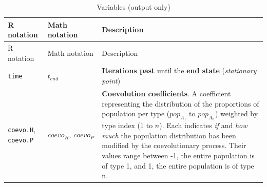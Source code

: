 \documentclass[]{book}
\begin{document}
\begin{longtable}[]{@{}lll@{}}
\caption{Variables (output only)}\tabularnewline
\toprule
\begin{minipage}[b]{0.36\columnwidth}\raggedright
R notation\strut
\end{minipage} & \begin{minipage}[b]{0.21\columnwidth}\raggedright
Math notation\strut
\end{minipage} & \begin{minipage}[b]{0.34\columnwidth}\raggedright
Description\strut
\end{minipage}\tabularnewline
\midrule
\endfirsthead
\toprule
\begin{minipage}[b]{0.36\columnwidth}\raggedright
R notation\strut
\end{minipage} & \begin{minipage}[b]{0.21\columnwidth}\raggedright
Math notation\strut
\end{minipage} & \begin{minipage}[b]{0.34\columnwidth}\raggedright
Description\strut
\end{minipage}\tabularnewline
\midrule
\endhead
\begin{minipage}[t]{0.36\columnwidth}\raggedright
\texttt{time}\strut
\end{minipage} & \begin{minipage}[t]{0.21\columnwidth}\raggedright
\(t_{end}\)\strut
\end{minipage} & \begin{minipage}[t]{0.34\columnwidth}\raggedright
\textbf{Iterations past} until the \textbf{end state} (\emph{stationary point})\strut
\end{minipage}\tabularnewline
\begin{minipage}[t]{0.36\columnwidth}\raggedright
\texttt{coevo.H}, \texttt{coevo.P}\strut
\end{minipage} & \begin{minipage}[t]{0.21\columnwidth}\raggedright
\(coevo_{H},\,coevo_{P}\)\strut
\end{minipage} & \begin{minipage}[t]{0.34\columnwidth}\raggedright
\textbf{Coevolution coefficients}. A coefficient representing the distribution of the proportions of population per type (\(pop_{A_1}\) to \(pop_{A_n}\)) weighted by type index (\(1\) to \(n\)). Each indicates \emph{if} and \emph{how much} the population distribution has been modified by the coevolutionary process. Their values range between -1, the entire population is of type 1, and 1, the entire population is of type n.\strut

\end{minipage}
\end{longtable}
\end{document}
